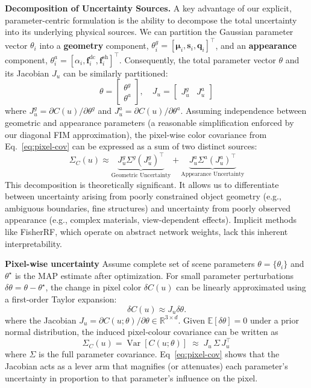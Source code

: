 \documentclass{egpubl}
\begin{document}
\textbf{Decomposition of Uncertainty Sources.}
A key advantage of our explicit, parameter-centric formulation is the ability to decompose the total uncertainty into its underlying physical sources. We can partition the Gaussian parameter vector $\theta_i$ into a \textbf{geometry} component, $\theta_i^g = [\boldsymbol{\mu}_i, \mathbf{s}_i, \mathbf{q}_i]^\top$, and an \textbf{appearance} component, $\theta_i^a = [\alpha_i, \mathbf{f}_i^{\text{dc}}, \mathbf{f}_i^{\text{sh}}]^\top$. Consequently, the total parameter vector $\theta$ and its Jacobian $J_u$ can be similarly partitioned:
\begin{equation}
    \theta = \begin{bmatrix} \theta^g \\ \theta^a \end{bmatrix}, \quad J_u = \begin{bmatrix} J_u^g & J_u^a \end{bmatrix}
    \label{eq:decomposition}
\end{equation}
where $J_u^g = \partial C(u) / \partial \theta^g$ and $J_u^a = \partial C(u) / \partial \theta^a$. Assuming independence between geometric and appearance parameters (a reasonable simplification enforced by our diagonal FIM approximation), the pixel-wise color covariance from Eq.~\ref{eq:pixel-cov} can be expressed as a sum of two distinct sources:
\begin{equation}
    \Sigma_{C}(u) \approx \underbrace{J_u^g \Sigma^g (J_u^g)^{\top}}_{\text{Geometric Uncertainty}} + \underbrace{J_u^a \Sigma^a (J_u^a)^{\top}}_{\text{Appearance Uncertainty}}
    \label{eq:cov_decomposition}
\end{equation}
This decomposition is theoretically significant. It allows us to differentiate between uncertainty arising from poorly constrained object geometry (e.g., ambiguous boundaries, fine structures) and uncertainty from poorly observed appearance (e.g., complex materials, view-dependent effects). Implicit methods like FisherRF, which operate on abstract network weights, lack this inherent interpretability.

\textbf{Pixel-wise uncertainty} Assume complete set of scene parameters $\theta = \{\theta_i\}$ and $\theta^\star$ is the MAP estimate after optimization. 
For small parameter perturbations $\delta\theta = \theta - \theta^\star$, the change in pixel color $\delta C(u)$ can be linearly approximated using a first-order Taylor expansion:
\[
\delta C(u) \approx J_u \delta\theta .
\]
where the Jacobian $J_u=\partial C(u;\theta)/\partial\theta \in\mathbb R^{3\times d}$. 
Given $\mathbb E[\delta\theta]=0$ under a prior normal distribution, the induced pixel‑colour covariance can be written as 
\begin{equation}
\Sigma_{C}(u)=\operatorname{Var}[C(u;\theta)]
\;\approx\;J_u\,\Sigma\,J_u^{\!\top}
\label{eq:pixel-cov}
\end{equation}
where $\Sigma$ is the full parameter covariance. Eq~\ref{eq:pixel-cov} shows that the Jacobian acts as a lever arm that magnifies (or attenuates) each parameter’s uncertainty in proportion to that parameter’s influence on the pixel.
\end{document}
